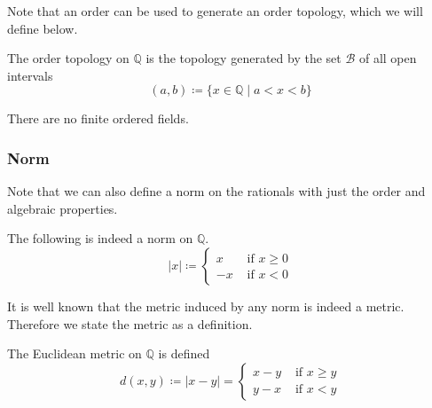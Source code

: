 \documentclass{article}
\begin{document}
      Note that an order can be used to generate an order topology, which we will define below. 

      \begin{definition}
        The order topology on $\mathbb{Q}$ is the topology generated by the set $\mathscr{B}$ of all open intervals 
        \begin{equation}
          (a, b) \coloneqq \{ x \in \mathbb{Q} \mid a < x < b\}
        \end{equation}
      \end{definition}

      \begin{theorem}
        There are no finite ordered fields. 
      \end{theorem} 

    \subsubsection{Norm} 

      Note that we can also define a norm on the rationals with just the order and algebraic properties. 

      \begin{theorem} 
        The following is indeed a norm on $\mathbb{Q}$. 
        \begin{equation}
          |x| \coloneqq \begin{cases} x & \text{ if } x \geq 0 \\ -x & \text{ if } x < 0 \end{cases}
        \end{equation} 
      \end{theorem} 

      It is well known that the metric induced by any norm is indeed a metric. Therefore we state the metric as a definition. 

      \begin{definition}
        The Euclidean metric on $\mathbb{Q}$ is defined 
        \begin{equation}
          d(x, y) \coloneqq |x - y| = \begin{cases} x - y & \text{ if } x \geq y \\ y - x & \text{ if } x < y \end{cases}
        \end{equation}
      \end{definition}
\end{document}
